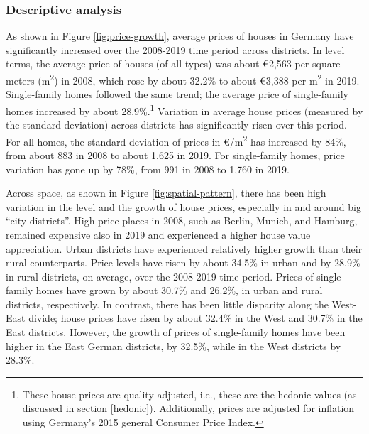 \documentclass[
  12pt,
]{article}
\begin{document}
\subsubsection{Descriptive analysis}\label{descriptive-analysis}

As shown in Figure \ref{fig:price-growth}, average prices of houses in Germany have significantly increased over the 2008-2019 time period across districts. In level terms, the average price of houses (of all types) was about €2,563 per square meters (m\textsuperscript{2}) in 2008, which rose by about 32.2\% to about €3,388 per m\textsuperscript{2} in 2019. Single-family homes followed the same trend; the average price of single-family homes increased by about 28.9\%.\footnote{These house prices are quality-adjusted, i.e., these are the hedonic values (as discussed in section \ref{hedonic}). Additionally, prices are adjusted for inflation using Germany's 2015 general Consumer Price Index.} Variation in average house prices (measured by the standard deviation) across districts has significantly risen over this period. For all homes, the standard deviation of prices in €/m\textsuperscript{2} has increased by 84\%, from about 883 in 2008 to about 1,625 in 2019. For single-family homes, price variation has gone up by 78\%, from 991 in 2008 to 1,760 in 2019.

Across space, as shown in Figure \ref{fig:spatial-pattern}, there has been high variation in the level and the growth of house prices, especially in and around big ``city-districts''. High-price places in 2008, such as Berlin, Munich, and Hamburg, remained expensive also in 2019 and experienced a higher house value appreciation. Urban districts have experienced relatively higher growth than their rural counterparts. Price levels have risen by about 34.5\% in urban and by 28.9\% in rural districts, on average, over the 2008-2019 time period. Prices of single-family homes have grown by about 30.7\% and 26.2\%, in urban and rural districts, respectively. In contrast, there has been little disparity along the West-East divide; house prices have risen by about 32.4\% in the West and 30.7\% in the East districts. However, the growth of prices of single-family homes have been higher in the East German districts, by 32.5\%, while in the West districts by 28.3\%.
\end{document}
